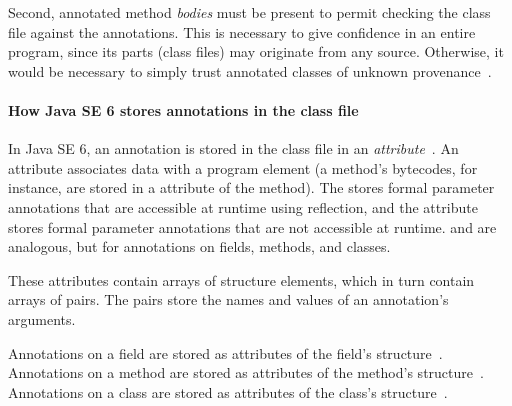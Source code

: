 \documentclass[10pt]{article}
\begin{document}
Second, annotated method \emph{bodies} must be present to permit checking
the class file against the annotations.  This is necessary to give
confidence in an entire program, since its parts (class files) may
originate from any source.  Otherwise, it would be necessary to simply
trust annotated classes of unknown provenance~\cite{BurdyHP2007}.



\paragraph{How Java SE 6 stores annotations in the class file}


In Java SE 6, an annotation is stored in the class file in an
\emph{attribute}~\cite{JSR175,LindholmY99:CFF5}.  An attribute 
associates data with a program element (a
method's bytecodes, for instance, are stored in a 
attribute of the method). The \RuntimeVisibleParameterAnnotations stores formal parameter annotations that are accessible at runtime using reflection, and the
\RuntimeInvisibleParameterAnnotations attribute stores formal parameter annotations
that are not accessible at runtime.
\RuntimeVisibleAnnotations and 
\RuntimeInvisibleAnnotations are analogous, but for annotations on fields,
methods, and classes.

These attributes contain arrays of
 structure elements, which in turn contain arrays of
 pairs.  The  pairs store
the names and values of an annotation's arguments.

Annotations on a field are stored as attributes of the field's 
 structure~\cite[\S 4.6]{LindholmY99:CFF5}.
Annotations on a method are stored as attributes of the method's
 structure~\cite[\S 4.7]{LindholmY99:CFF5}.
Annotations on a class are stored as attributes of the class's
 structure~\cite[\S 4.2]{LindholmY99:CFF5}.
\end{document}
